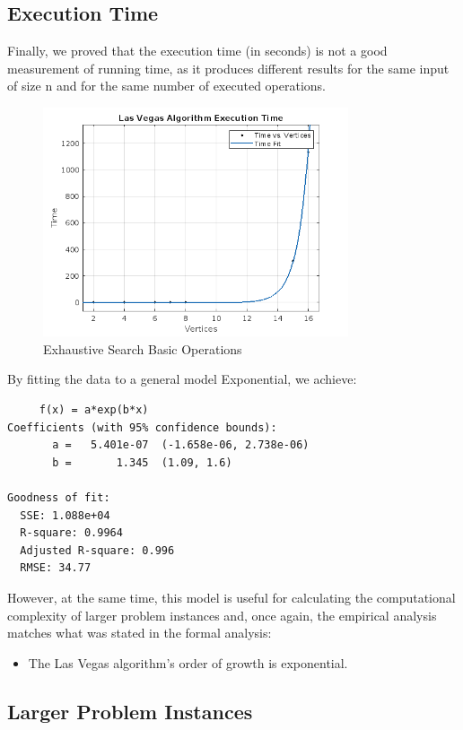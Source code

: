 \documentclass[]{revdetua}
\begin{document}
\subsection{Execution Time}

Finally, we proved that the execution time (in seconds) is not a good measurement of running time, as it produces different results for the same input of size n and for the same number of executed operations.

\begin{figure}[H]
    \centering
    \includegraphics[width=9cm]{Las Vegas Algorithm/Las Vegas Algorithm Execution Time.png}
    \caption{Exhaustive Search Basic Operations}
\end{figure}

By fitting the data to a general model Exponential, we achieve:
\begin{verbatim}
     f(x) = a*exp(b*x)
Coefficients (with 95% confidence bounds):
       a =   5.401e-07  (-1.658e-06, 2.738e-06)
       b =       1.345  (1.09, 1.6)

Goodness of fit:
  SSE: 1.088e+04
  R-square: 0.9964
  Adjusted R-square: 0.996
  RMSE: 34.77
\end{verbatim}

However, at the same time, this model is useful for calculating the computational complexity of larger problem instances and, once again, the empirical analysis matches what was stated in the formal analysis:
\begin{itemize}
\item The Las Vegas algorithm's order of growth is exponential.
\end{itemize}

\subsection{Larger Problem Instances}
\end{document}
